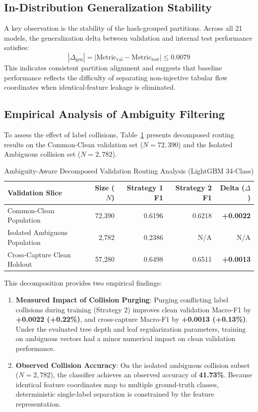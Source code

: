 \documentclass[conference,10pt,twocolumn]{IEEEtran}
\begin{document}
\subsection{In-Distribution Generalization Stability}
A key observation is the stability of the hash-grouped partitions. Across all 21 models, the generalization delta between validation and internal test performance satisfies:
\begin{equation}
|\Delta_{\text{gen}}| = |\text{Metric}_{\text{val}} - \text{Metric}_{\text{test}}| \le \mathbf{0.0079}
\end{equation}
This indicates consistent partition alignment and suggests that baseline performance reflects the difficulty of separating non-injective tabular flow coordinates when identical-feature leakage is eliminated.

\subsection{Empirical Analysis of Ambiguity Filtering}
To assess the effect of label collisions, Table~\ref{tab:ambiguity_routing} presents decomposed routing results on the Common-Clean validation set ($N = 72,390$) and the Isolated Ambiguous collision set ($N = 2,782$).

\begin{table}[h]
\centering
\caption{Ambiguity-Aware Decomposed Validation Routing Analysis (LightGBM 34-Class)}
\label{tab:ambiguity_routing}
\small
\begin{tabular}{@{}lrrrr@{}}
\toprule
\textbf{Validation Slice} & \textbf{Size ($N$)} & \textbf{Strategy 1 F1} & \textbf{Strategy 2 F1} & \textbf{Delta ($\Delta$)} \\ \midrule
Common-Clean Population & 72,390 & 0.6196 & 0.6218 & \textbf{+0.0022} \\
Isolated Ambiguous Population & 2,782 & 0.2386 & N/A & N/A \\ \midrule
Cross-Capture Clean Holdout & 57,280 & 0.6498 & 0.6511 & \textbf{+0.0013} \\ \bottomrule
\end{tabular}
\end{table}

This decomposition provides two empirical findings:
\begin{enumerate}
    \item \textbf{Measured Impact of Collision Purging}: Purging conflicting label collisions during training (Strategy 2) improves clean validation Macro-F1 by \textbf{+0.0022 (+0.22\%)}, and cross-capture Macro-F1 by \textbf{+0.0013 (+0.13\%)}. Under the evaluated tree depth and leaf regularization parameters, training on ambiguous vectors had a minor numerical impact on clean validation performance.
    \item \textbf{Observed Collision Accuracy}: On the isolated ambiguous collision subset ($N = 2,782$), the classifier achieves an observed accuracy of \textbf{41.73\%}. Because identical feature coordinates map to multiple ground-truth classes, deterministic single-label separation is constrained by the feature representation.
\end{enumerate}
\end{document}
